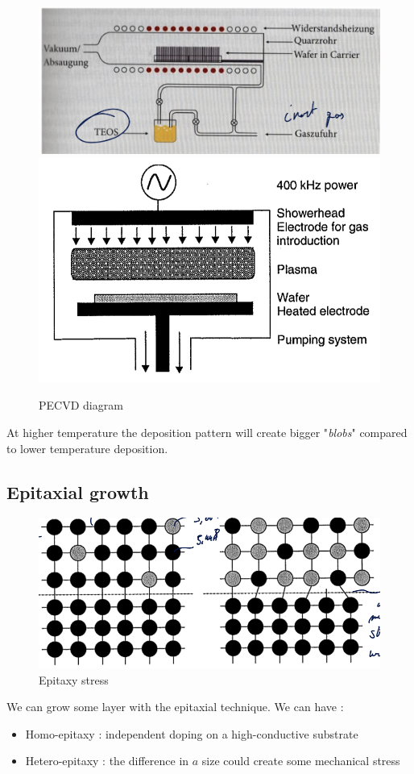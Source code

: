 \documentclass{report}
\begin{document}
\begin{figure}[H]
    \centering
    \includegraphics[width=0.65\linewidth]{pecvd.png}
    \includegraphics[width=0.33\linewidth]{PECVD_reactor.png}
    \caption{PECVD diagram}
    \label{fig:pecvd-label}
\end{figure}

At higher temperature the deposition pattern will create bigger "\textit{blobs}" compared to lower temperature deposition.

\subsection{Epitaxial growth}

\begin{figure}
    \centering
    \includegraphics[width=0.95\linewidth]{mechanical_stress_epitaxy.png}
    \caption{Epitaxy stress}
    \label{fig:epitaxy-stress-label}
\end{figure}

We can grow some layer with the epitaxial technique. We can have : 

\begin{itemize}
    \item Homo-epitaxy : independent doping on a high-conductive substrate
    \item Hetero-epitaxy : the difference in $a$ size could create some mechanical stress
\end{itemize}
\end{document}
